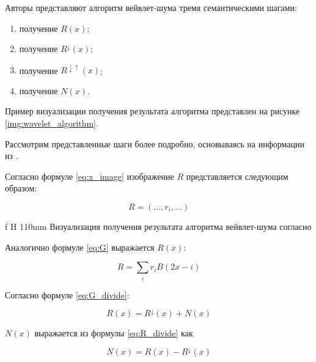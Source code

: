 Авторы \cite{pixar} представляют алгоритм вейвлет-шума тремя семантическими шагами:
\begin{enumerate}
	\item получение $R(x)$;%
	\item получение $R^\downarrow(x)$;%
	\item получение $R^{\downarrow\uparrow}(x)$;%
	\item получение $N(x)$.%
\end{enumerate}

Пример визуализации получения результата алгоритма представлен на рисунке \ref{img:wavelet_algorithm}.

Рассмотрим представленные шаги более подробно, основываясь на информации из \cite{pixar}.


Согласно формуле \ref{eq:x_image} изображение $R$ представляется следующим образом:

\begin{equation}\label{eq:R_image}
	R=(\dots,r_i,\dots)
\end{equation}

 {f} {H} {110mm}%
{Визуализация получения результата алгоритма вейвлет-шума согласно \cite{pixar}}

Аналогично формуле \ref{eq:G} выражается $R(x)$:

\begin{equation}\label{eq:R}
	R=\sum_{i}r_i B(2x-i)
\end{equation}


Согласно формуле \ref{eq:G_divide}:

\begin{equation}\label{eq:R_divide}
	R(x)=R^{\downarrow}(x)+N(x)
\end{equation}

$N(x)$ выражается из формулы \ref{eq:R_divide} как

\begin{equation}\label{eq:N_divide}
	N(x)=R(x)-R^{\downarrow}(x)
\end{equation}

